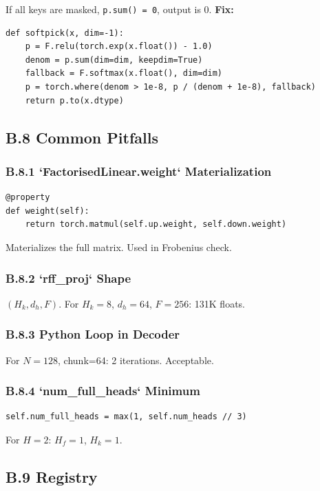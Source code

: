 If all keys are masked, \texttt{p.sum() = 0}, output is 0. \textbf{Fix:}

\begin{lstlisting}
def softpick(x, dim=-1):
    p = F.relu(torch.exp(x.float()) - 1.0)
    denom = p.sum(dim=dim, keepdim=True)
    fallback = F.softmax(x.float(), dim=dim)
    p = torch.where(denom > 1e-8, p / (denom + 1e-8), fallback)
    return p.to(x.dtype)
\end{lstlisting}

\subsection{B.8 Common Pitfalls}

\subsubsection{B.8.1 `FactorisedLinear.weight` Materialization}

\begin{lstlisting}
@property
def weight(self):
    return torch.matmul(self.up.weight, self.down.weight)
\end{lstlisting}

Materializes the full matrix. Used in Frobenius check.

\subsubsection{B.8.2 `rff\_proj` Shape}

$(H_k, d_h, F)$. For $H_k = 8$, $d_h = 64$, $F = 256$: 131K floats.

\subsubsection{B.8.3 Python Loop in Decoder}

For $N = 128$, chunk=64: 2 iterations. Acceptable.

\subsubsection{B.8.4 `num\_full\_heads` Minimum}

\begin{lstlisting}
self.num_full_heads = max(1, self.num_heads // 3)
\end{lstlisting}

For $H = 2$: $H_f = 1$, $H_k = 1$.

\subsection{B.9 Registry}

